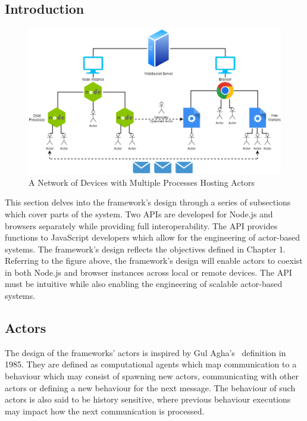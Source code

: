 \documentclass[oneside]{um-fict}
\begin{document}
\subsection{Introduction}
\begin{figure}[H]
    \begin{centering}
        \includegraphics[width=\textwidth]{resources/network.png}
        \caption{A Network of Devices with Multiple Processes Hosting Actors}
    \end{centering}
\end{figure}
This section delves into the framework's design through a series of subsections which cover parts of the system. Two APIs are developed for Node.js and browsers separately while providing full interoperability. The API provides functions to JavaScript developers which allow for the engineering of actor-based systems. The framework's design reflects the objectives defined in Chapter 1. Referring to the figure above, the framework's design will enable actors to coexist in both Node.js and browser instances across local or remote devices. The API must be intuitive while also enabling the engineering of scalable actor-based systems.
\subsection{Actors}
The design of the frameworks' actors is inspired by Gul Agha's~\cite{agha1985actors} definition in 1985. They are defined as computational agents which map communication to a behaviour which may consist of spawning new actors, communicating with other actors or defining a new behaviour for the next message. The behaviour of such actors is also said to be history sensitive, where previous behaviour executions may impact how the next communication is processed.
\end{document}
